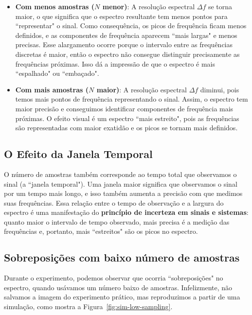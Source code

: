 \begin{itemize}
    \item \textbf{Com menos amostras (\( N \) menor)}: A resolução espectral \(\Delta f\) se torna maior, o que significa que o espectro resultante tem menos pontos para ``representar" o sinal. Como consequência, os picos de frequência ficam menos definidos, e as componentes de frequência aparecem ``mais largas" e menos precisas. Esse alargamento ocorre porque o intervalo entre as frequências discretas é maior, então o espectro não consegue distinguir precisamente as frequências próximas. Isso dá a impressão de que o espectro é mais ``espalhado" ou ``embaçado".

    \item \textbf{Com mais amostras (\( N \) maior)}: A resolução espectral \(\Delta f\) diminui, pois temos mais pontos de frequência representando o sinal. Assim, o espectro tem maior precisão e conseguimos identificar componentes de frequência mais próximas. O efeito visual é um espectro ``mais estreito", pois as frequências são representadas com maior exatidão e os picos se tornam mais definidos. 
\end{itemize}

\subsection*{O Efeito da Janela Temporal}

O número de amostras também corresponde ao tempo total que observamos o sinal (a ``janela temporal"). Uma janela maior significa que observamos o sinal por um tempo mais longo, e isso também aumenta a precisão com que medimos suas frequências. Essa relação entre o tempo de observação e a largura do espectro é uma manifestação do \textbf{princípio de incerteza em sinais e sistemas}: quanto maior o intervalo de tempo observado, mais precisa é a medição das frequências e, portanto, mais ``estreitos" são os picos no espectro.

\subsection*{Sobreposições com baixo número de amostras}

Durante o experimento, podemos observar que ocorria ``sobreposições" no espectro, quando usávamos um número baixo de amostras. Infelizmente, não salvamos a imagem do experimento prático, mas reproduzimos a partir de uma simulação, como mostra a Figura~\ref{fig:sim-low-sampling}.


